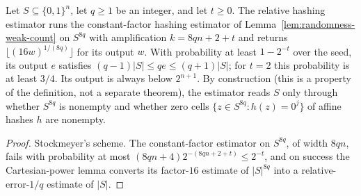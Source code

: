 \begin{theorem}
  \label{thm:randomness-approx-count}
  \leanok
  Let $S \subseteq \{0,1\}^n$, let $q \ge 1$ be an integer, and let
  $t \ge 0$. The relative hashing estimator runs the constant-factor hashing
  estimator of Lemma~\ref{lem:randomness-weak-count} on $S^{8q}$ with
  amplification $k = 8qn + 2 + t$ and returns
  $\lfloor (16w)^{1/(8q)} \rfloor$ for its output $w$. With probability at
  least $1 - 2^{-t}$ over the seed, its output $e$ satisfies
  $(q - 1)|S| \le qe \le (q + 1)|S|$; for $t = 2$ this probability is at least
  $3/4$. Its output is always below $2^{n+1}$. By construction (this is a
  property of the definition, not a separate theorem), the estimator reads
  $S$ only through whether $S^{8q}$ is nonempty and whether zero cells
  $\{z \in S^{8q} : h(z) = 0^j\}$ of affine hashes $h$ are nonempty.
\end{theorem}
\begin{proof}
  \leanok
  Stockmeyer's scheme. The constant-factor estimator on $S^{8q}$, of width
  $8qn$, fails with probability at most
  $(8qn + 4)2^{-(8qn + 2 + t)} \le 2^{-t}$, and on success the Cartesian-power
  lemma converts its factor-$16$ estimate of $|S|^{8q}$ into a
  relative-error-$1/q$ estimate of $|S|$.
\end{proof}

